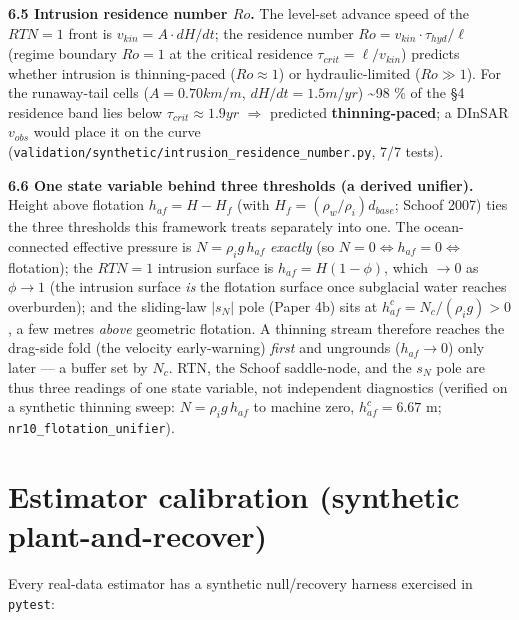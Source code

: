 \documentclass[tc, manuscript]{copernicus}
\begin{document}
\textbf{6.5 Intrusion residence number $Ro$.} The level-set advance speed of the $RTN=1$ front is $v_{kin}=A\cdot dH/dt$; the residence number $Ro=v_{kin}\cdot \tau _{hyd}/\ell $ (regime boundary $Ro=1$ at the critical residence $\tau _{crit}=\ell /v_{kin}$) predicts whether intrusion is thinning-paced ($Ro\approx 1$) or hydraulic-limited ($Ro\gg 1$). For the runaway-tail cells ($A=0.70 km/m$, $dH/dt=1.5 m/yr$) \textasciitilde{}98 \% of the §4 residence band lies below $\tau _{crit}\approx 1.9 yr$ \ensuremath{\Rightarrow} predicted \textbf{thinning-paced}; a DInSAR $v_{obs}$ would place it on the curve (\texttt{validation/\allowbreak{}synthetic/\allowbreak{}intrusion\_\allowbreak{}residence\_\allowbreak{}number.\allowbreak{}py}, 7/7 tests).


\textbf{6.6 One state variable behind three thresholds (a derived unifier).} Height above flotation $h_{af}=H-H_{f}$ (with $H_{f}=(\rho _{w}/\rho _{i})d_{base}$; Schoof 2007) ties the three thresholds this framework treats separately into one. The ocean-connected effective pressure is $N=\rho _{i}g\,h_{af}$ \emph{exactly} (so $N=0\iff h_{af}=0\iff $ flotation); the $RTN=1$ intrusion surface is $h_{af}=H(1-\phi )$, which $\to 0$ as $\phi \to 1$ (the intrusion surface \emph{is} the flotation surface once subglacial water reaches overburden); and the sliding-law $|s_{N}|$ pole (Paper 4b) sits at $h_{af}^{c}=N_{c}/(\rho _{i}g)>0$, a few metres \emph{above} geometric flotation. A thinning stream therefore reaches the drag-side fold (the velocity early-warning) \emph{first} and ungrounds ($h_{af}\to 0$) only later --- a buffer set by $N_{c}$. RTN, the Schoof saddle-node, and the $s_{N}$ pole are thus three readings of one state variable, not independent diagnostics (verified on a synthetic thinning sweep: $N=\rho _{i}g\,h_{af}$ to machine zero, $h_{af}^{c}=6.67$ m; \texttt{nr10\_\allowbreak{}flotation\_\allowbreak{}unifier}).

\section{Estimator calibration (synthetic plant-and-recover)}

Every real-data estimator has a synthetic null/recovery harness exercised in \texttt{pytest}:
\end{document}
